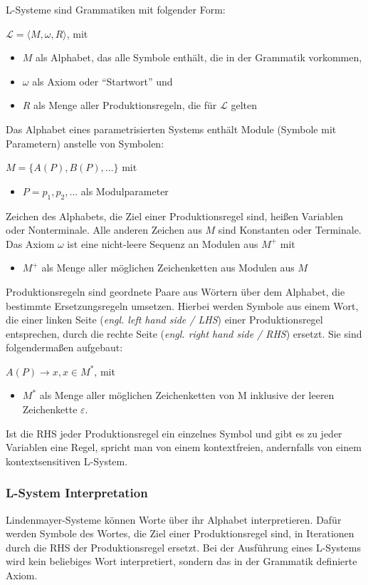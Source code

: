 L-Systeme sind Grammatiken mit folgender Form:
\begin{center}
    $\mathcal{L}=\langle M,\omega,R \rangle$, mit
    \begin{itemize}
        \item $M$ als Alphabet, das alle Symbole enthält, die in der Grammatik vorkommen,
        \item $\omega$ als Axiom oder "`Startwort"' und
        \item $R$ als Menge aller Produktionsregeln, die für $\mathcal{L}$ gelten
    \end{itemize}
\end{center}
Das Alphabet eines parametrisierten Systems enthält Module (Symbole mit Parametern) anstelle von Symbolen:
\begin{center}
    $M=\{A(P),B(P),\dots\}$ mit
    \begin{itemize}
        \item $P=p_1,p_2,\dots$ als Modulparameter
    \end{itemize}
\end{center}
Zeichen des Alphabets, die Ziel einer Produktionsregel sind, heißen Variablen oder Nonterminale.
Alle anderen Zeichen aus $M$ sind Konstanten oder Terminale.
Das Axiom $\omega$ ist eine nicht-leere Sequenz an Modulen aus $M^+$ mit
\begin{itemize}
    \item $M^+$ als Menge aller möglichen Zeichenketten aus Modulen aus $M$
\end{itemize}
Produktionsregeln sind geordnete Paare aus Wörtern über dem Alphabet, die bestimmte Ersetzungsregeln umsetzen.
Hierbei werden Symbole aus einem Wort, die einer linken Seite (\textit{engl. left hand side / LHS}) einer
Produktionsregel entsprechen, durch die rechte Seite (\textit{engl. right hand side / RHS}) ersetzt.
Sie sind folgendermaßen aufgebaut:
\begin{center}
    $A(P)\rightarrow x,x\in M^*$, mit
    \begin{itemize}
        \item $M^*$ als Menge aller möglichen Zeichenketten von M inklusive der leeren Zeichenkette $\varepsilon$.
    \end{itemize}
\end{center}
Ist die RHS jeder Produktionsregel ein einzelnes Symbol und gibt es zu jeder Variablen eine Regel, spricht man
von einem kontextfreien, andernfalls von einem kontextsensitiven L-System.

\subsubsection*{L-System Interpretation}
Lindenmayer-Systeme können Worte über ihr Alphabet interpretieren.
Dafür werden Symbole des Wortes, die Ziel einer Produktionsregel sind, in Iterationen durch die RHS
der Produktionsregel ersetzt.
Bei der Ausführung eines L-Systems wird kein beliebiges Wort interpretiert, sondern das in der
Grammatik definierte Axiom.


